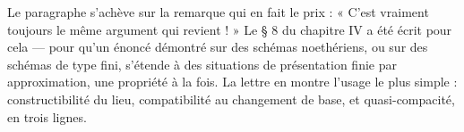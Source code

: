 \documentclass[11pt,a4paper]{article}
\begin{document}
Le paragraphe s'achève sur la remarque qui en fait le prix : « C'est vraiment
toujours le même argument qui revient ! » Le § 8 du chapitre IV a été écrit
pour cela — pour qu'un énoncé démontré sur des schémas noethériens, ou sur des
schémas de type fini, s'étende à des situations de présentation finie par
approximation, une propriété à la fois. La lettre en montre l'usage le plus
simple : constructibilité du lieu, compatibilité au changement de base, et
quasi-compacité, en trois lignes.
\end{document}
